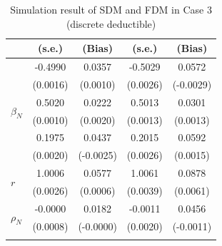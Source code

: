 \documentclass[11pt]{article}
\begin{document}
\begin{table}[!ht]
{{\begin{minipage}{0.5\textwidth}
\begin{tabular}{lcccc}
        & (s.e.) & (Bias) & (s.e.) & (Bias) \\
        \midrule
        \multirow{6}{*}{$\beta_N$} & -0.4990 & 0.0357 & -0.5029 & 0.0572 \\
         & (0.0016) & (0.0010) & (0.0026) & (-0.0029) \\
        \cmidrule{2-5}
         & 0.5020 & 0.0222 & 0.5013 & 0.0301 \\
         & (0.0010) & (0.0020) & (0.0013) & (0.0013) \\
        \cmidrule{2-5}
         & 0.1975 & 0.0437 & 0.2015 & 0.0592 \\
         & (0.0020) & (-0.0025) & (0.0026) & (0.0015) \\
        \midrule
        \multirow{2}{*}{$r$} & 1.0006 & 0.0577 & 1.0061 & 0.0878 \\
         & (0.0026) & (0.0006) & (0.0039) & (0.0061) \\
        \midrule
        \multirow{2}{*}{$\rho_N$} & -0.0000 & 0.0182 & -0.0011 & 0.0456 \\
         & (0.0008) & (-0.0000) & (0.0020) & (-0.0011) \\
        \hhline{=====}
        \end{tabular}
    \end{minipage}
}
}
\caption{Simulation result of SDM and FDM in Case 3 (discrete deductible)}\label{tab:AppSimEndCase3}
\end{table}
\end{document}
